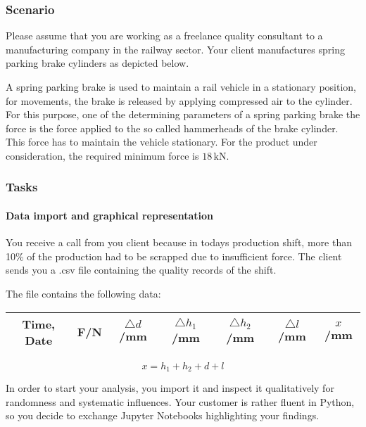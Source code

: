 \begin{frame}\frametitle{Scenario}
    Please assume that you are working as a freelance quality consultant to a manufacturing company in the railway sector. Your client manufactures spring parking brake cylinders as depicted below.
    \vspace{1cm}
\begin{center}

\end{center}
A spring parking brake is used to maintain a rail vehicle in a stationary position, for movements, the brake is released by applying compressed air to the cylinder. For this purpose, one of the determining parameters of a spring parking brake the force is the force applied to the so called hammerheads of the brake cylinder. This force has to maintain the vehicle stationary. For the product under consideration, the required minimum force is $18 \, \mathrm{kN}$.
\end{frame}

\begin{frame}
    \frametitle{Tasks}
    \framesubtitle{Data import and graphical representation}
        You receive a call from you client because in todays production shift, more than 10\% of the production had to be scrapped due to insufficient force. The client sends you a .csv file containing the quality records of the shift.

The file contains the following data:
\vspace{.5cm}

{\small
\begin{tabular}{|c|c|c|c|c|c|c|}

\hline
Time, Date & F/N & $\triangle d$/mm & $\triangle h_{1}$/mm & $ \triangle h_{2}$/mm & $\triangle l$/mm & $x$/mm \\ \hline
\end{tabular}}

\begin{equation*}
x = h_1 + h_2 + d + l
\end{equation*}
\vspace{.5cm}

In order to start your analysis, you import it and inspect it qualitatively for randomness and systematic influences. Your customer is rather fluent in Python, so you decide to exchange Jupyter Notebooks highlighting your findings.
\end{frame}

